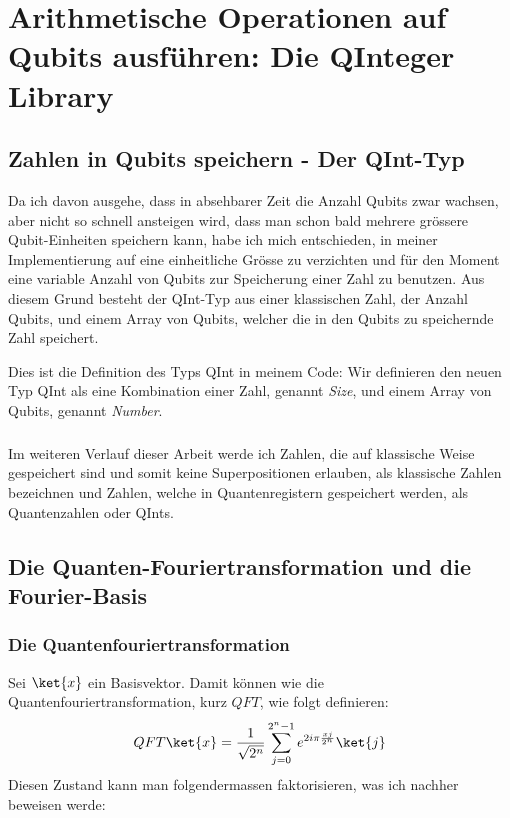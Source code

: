 \chapter{Arithmetische Operationen auf Qubits ausführen: Die QInteger Library}
\section{Zahlen in Qubits speichern - Der QInt-Typ}
Da ich davon ausgehe, dass in absehbarer Zeit die Anzahl Qubits zwar wachsen, aber nicht so schnell ansteigen wird, dass man schon bald mehrere grössere Qubit-Einheiten speichern kann, habe ich mich entschieden, in meiner Implementierung auf eine einheitliche Grösse zu verzichten und für den Moment eine variable Anzahl von Qubits zur Speicherung einer Zahl zu benutzen. Aus diesem Grund besteht der QInt-Typ aus einer klassischen Zahl, der Anzahl Qubits, und einem Array von Qubits, welcher die in den Qubits zu speichernde Zahl speichert.



Dies ist die Definition des Typs QInt in meinem Code: Wir definieren den neuen Typ \grqq QInt\grqq{} als eine Kombination einer Zahl, genannt \textit{Size}, und einem Array von Qubits, genannt \textit{Number}.

\paragraph{}

Im weiteren Verlauf dieser Arbeit werde ich Zahlen, die auf klassische Weise gespeichert sind und somit keine Superpositionen erlauben, als \grqq klassische Zahlen\grqq{} bezeichnen und Zahlen, welche in Quantenregistern gespeichert werden, als \grqq Quantenzahlen\grqq{} oder \grqq QInts\grqq{}.

\section{Die Quanten-Fouriertransformation und die Fourier-Basis}
\subsection{Die Quantenfouriertransformation}
Sei $\ket{x}$ ein Basisvektor. Damit können wie die Quantenfouriertransformation, kurz $QFT$, wie folgt definieren:
$$QFT\ket{x} = \frac{1}{\sqrt{2^n}}\sum^{2^n - 1}_{j = 0}e^{2i\pi\frac{xj}{2^n}}\ket{j}$$
Diesen Zustand kann man folgendermassen faktorisieren, was ich nachher beweisen werde:

